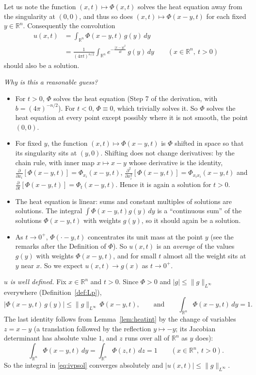\documentclass[11pt]{article}
\theoremstyle{plain}
\theoremstyle{definition}
\theoremstyle{remark}
\begin{document}
Let us note the function $(x,t) \mapsto \Phi(x,t)$ solves the heat equation away from the singularity at $(0,0)$, and thus so does $(x,t) \mapsto \Phi(x - y, t)$ for each fixed $y \in \mathbb{R}^n$. Consequently the convolution
\begin{equation}\label{eq:ivpsol}
\begin{aligned}
u(x,t) &= \int_{\mathbb{R}^n}\Phi(x - y, t)\, g(y)\, dy \\
&= \frac{1}{(4\pi t)^{n/2}}\int_{\mathbb{R}^n} e^{-\frac{|x-y|^2}{4t}}\, g(y)\, dy \qquad (x \in \mathbb{R}^n,\ t > 0)
\end{aligned}
\end{equation}
should also be a solution.

\emph{Why is this a reasonable guess?}
\begin{itemize}
    \item For $t > 0$, $\Phi$ solves the heat equation (Step 7 of the derivation, with $b = (4\pi)^{-n/2}$). For $t < 0$, $\Phi \equiv 0$, which trivially solves it. So $\Phi$ solves the heat equation at every point except possibly where it is not smooth, the point $(0,0)$.
    \item For fixed $y$, the function $(x,t) \mapsto \Phi(x - y, t)$ is $\Phi$ shifted in space so that its singularity sits at $(y,0)$. Shifting does not change derivatives: by the chain rule, with inner map $x \mapsto x - y$ whose derivative is the identity, $\frac{\partial}{\partial x_i}[\Phi(x-y,t)] = \Phi_{x_i}(x - y,t)$, $\frac{\partial^2}{\partial x_i^2}[\Phi(x-y,t)] = \Phi_{x_ix_i}(x - y,t)$ and $\frac{\partial}{\partial t}[\Phi(x-y,t)] = \Phi_t(x-y,t)$. Hence it is again a solution for $t > 0$.
    \item The heat equation is linear: sums and constant multiples of solutions are solutions. The integral $\int \Phi(x-y,t)g(y)\,dy$ is a ``continuous sum'' of the solutions $\Phi(x - y,t)$ with weights $g(y)$, so it should again be a solution.
    \item As $t \to 0^+$, $\Phi(\cdot - y,t)$ concentrates its unit mass at the point $y$ (see the remarks after the Definition of $\Phi$). So $u(x,t)$ is an \emph{average} of the values $g(y)$ with weights $\Phi(x-y,t)$, and for small $t$ almost all the weight sits at $y$ near $x$. So we expect $u(x,t) \to g(x)$ as $t \to 0^+$.
\end{itemize}

\emph{$u$ is well defined.} Fix $x \in \mathbb{R}^n$ and $t > 0$. Since $\Phi > 0$ and $|g| \leq \|g\|_{L^\infty}$ everywhere (Definition~\ref{def:Lp}),
$$ |\Phi(x - y,t)\, g(y)| \leq \|g\|_{L^\infty}\, \Phi(x - y,t), \qquad\text{and}\qquad \int_{\mathbb{R}^n}\Phi(x - y,t)\, dy = 1. $$
The last identity follows from Lemma~\ref{lem:heatint} by the change of variables $z = x - y$ (a translation followed by the reflection $y \mapsto -y$; its Jacobian determinant has absolute value $1$, and $z$ runs over all of $\mathbb{R}^n$ as $y$ does):
\begin{equation}\label{eq:mass1}
\int_{\mathbb{R}^n}\Phi(x - y,t)\, dy = \int_{\mathbb{R}^n}\Phi(z,t)\, dz = 1 \qquad (x \in \mathbb{R}^n,\ t > 0).
\end{equation}
So the integral in \eqref{eq:ivpsol} converges absolutely and $|u(x,t)| \leq \|g\|_{L^\infty}$.
\end{document}
